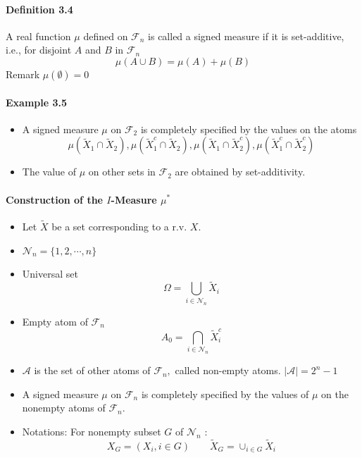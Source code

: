 \documentclass[8pt]{article}
\begin{document}
\paragraph{Definition 3.4} A real function $\mu$ defined on $\mathcal{F}_{n}$ is called a signed measure if it is set-additive, i.e., for disjoint $A$ and $B$ in $\mathcal{F}_{n}$
$$
\mu(A \cup B)=\mu(A)+\mu(B)
$$
Remark $\mu(\emptyset)=0$

\paragraph{Example 3.5}
\begin{itemize}
	\item A signed measure $\mu$ on $\mathcal{F}_{2}$ is completely specified by the values on the atoms
	$$
	\mu\left(\tilde{X}_{1} \cap \tilde{X}_{2}\right), \mu\left(\tilde{X}_{1}^{c} \cap \tilde{X}_{2}\right), \mu\left(\tilde{X}_{1} \cap \tilde{X}_{2}^{c}\right), \mu\left(\tilde{X}_{1}^{c} \cap \tilde{X}_{2}^{c}\right)
	$$
	\item The value of $\mu$ on other sets in $\mathcal{F}_{2}$ are obtained by set-additivity.
\end{itemize}
\paragraph{Construction of the $I$-Measure $\mu^{*}$}
\begin{itemize}
	\item Let $\tilde{X}$ be a set corresponding to a r.v. $X$.
	\item $\mathcal{N}_{n}=\{1,2, \cdots, n\}$
	\item  Universal set
	$$
	\Omega=\bigcup_{i \in \mathcal{N}_{n}} \tilde{X}_{i}
	$$
	\item Empty atom of $\mathcal{F}_{n}$
	$$
	A_{0}=\bigcap_{i \in \mathcal{N}_{n}} \tilde{X}_{i}^{c}
	$$
	\item $\mathcal{A}$ is the set of other atoms of $\mathcal{F}_{n},$ called non-empty atoms. $|\mathcal{A}|=2^{n}-1$
	\item A signed measure $\mu$ on $\mathcal{F}_{n}$ is completely specified by the values of $\mu$ on the nonempty atoms of $\mathcal{F}_{n}$.
	\item Notations: For nonempty subset $G$ of $\mathcal{N}_{n}$ :
	$$X_{G}=\left(X_{i}, i \in G\right) \qquad \tilde{X}_{G}=\cup_{i \in G} \tilde{X}_{i}$$

\end{itemize}
\end{document}
